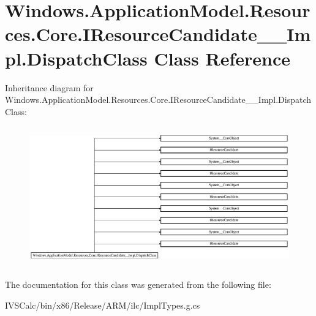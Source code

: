 \hypertarget{class_windows_1_1_application_model_1_1_resources_1_1_core_1_1_i_resource_candidate_____impl_1_1_dispatch_class}{}\section{Windows.\+Application\+Model.\+Resources.\+Core.\+I\+Resource\+Candidate\+\_\+\+\_\+\+Impl.\+Dispatch\+Class Class Reference}
\label{class_windows_1_1_application_model_1_1_resources_1_1_core_1_1_i_resource_candidate_____impl_1_1_dispatch_class}
Inheritance diagram for Windows.\+Application\+Model.\+Resources.\+Core.\+I\+Resource\+Candidate\+\_\+\+\_\+\+Impl.\+Dispatch\+Class\+:\begin{figure}[H]
\begin{center}
\leavevmode
\includegraphics[height=6.086957cm]{class_windows_1_1_application_model_1_1_resources_1_1_core_1_1_i_resource_candidate_____impl_1_1_dispatch_class}
\end{center}
\end{figure}


The documentation for this class was generated from the following file\+:\begin{DoxyCompactItemize}
\item 
I\+V\+S\+Calc/bin/x86/\+Release/\+A\+R\+M/ilc/Impl\+Types.\+g.\+cs\end{DoxyCompactItemize}

